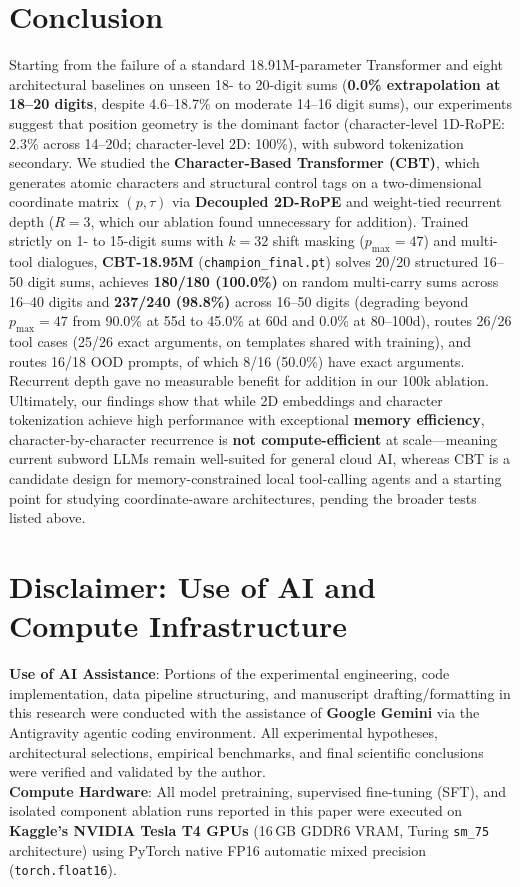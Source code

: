 \documentclass[10pt,twocolumn]{article}
\begin{document}
\section{Conclusion}

Starting from the failure of a standard 18.91M-parameter Transformer and eight architectural baselines on unseen 18- to 20-digit sums (\textbf{0.0\% extrapolation at 18--20 digits}, despite 4.6--18.7\% on moderate 14--16 digit sums), our experiments suggest that position geometry is the dominant factor (character-level 1D-RoPE: 2.3\% across 14--20d; character-level 2D: 100\%), with subword tokenization secondary. We studied the \textbf{Character-Based Transformer (CBT)}, which generates atomic characters and structural control tags on a two-dimensional coordinate matrix $(p, \tau)$ via \textbf{Decoupled 2D-RoPE} and weight-tied recurrent depth ($R=3$, which our ablation found unnecessary for addition). Trained strictly on 1- to 15-digit sums with $k=32$ shift masking ($p_{\max}=47$) and multi-tool dialogues, \textbf{CBT-18.95M} (\texttt{champion\_final.pt}) solves 20/20 structured 16--50 digit sums, achieves \textbf{180/180 (100.0\%)} on random multi-carry sums across 16--40 digits and \textbf{237/240 (98.8\%)} across 16--50 digits (degrading beyond $p_{\max}=47$ from 90.0\% at 55d to 45.0\% at 60d and 0.0\% at 80--100d), routes 26/26 tool cases (25/26 exact arguments, on templates shared with training), and routes 16/18 OOD prompts, of which 8/16 (50.0\%) have exact arguments. Recurrent depth gave no measurable benefit for addition in our 100k ablation. Ultimately, our findings show that while 2D embeddings and character tokenization achieve high performance with exceptional \textbf{memory efficiency}, character-by-character recurrence is \textbf{not compute-efficient} at scale—meaning current subword LLMs remain well-suited for general cloud AI, whereas CBT is a candidate design for memory-constrained local tool-calling agents and a starting point for studying coordinate-aware architectures, pending the broader tests listed above.

\section*{Disclaimer: Use of AI and Compute Infrastructure}
\noindent \textbf{Use of AI Assistance}: Portions of the experimental engineering, code implementation, data pipeline structuring, and manuscript drafting/formatting in this research were conducted with the assistance of \textbf{Google Gemini} via the Antigravity agentic coding environment. All experimental hypotheses, architectural selections, empirical benchmarks, and final scientific conclusions were verified and validated by the author.\\[3pt]
\noindent \textbf{Compute Hardware}: All model pretraining, supervised fine-tuning (SFT), and isolated component ablation runs reported in this paper were executed on \textbf{Kaggle's NVIDIA Tesla T4 GPUs} (16\,GB GDDR6 VRAM, Turing \texttt{sm\_75} architecture) using PyTorch native FP16 automatic mixed precision (\texttt{torch.float16}).
\end{document}
